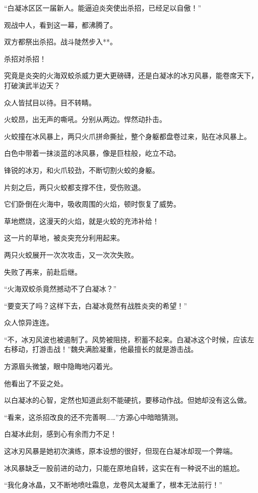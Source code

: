 \begin{this_body}
“白凝冰区区一届新人。能逼迫炎突使出杀招，已经足以自傲！”

观战中人，看到这一幕，都沸腾了。

双方都祭出杀招。战斗陡然步入**。

杀招对杀招！

究竟是炎突的火海双蛟杀威力更大更磅礴，还是白凝冰的冰刃风暴，能卷席天下，打破演武半边天？

众人皆拭目以待。目不转睛。

火蛟昂，出无声的嘶吼。分别从两边。悍然动扑击。

火蛟撞在冰风暴上，两只火爪拼命撕扯，整个身躯都盘卷过来，贴在冰风暴上。

白色中带着一抹淡蓝的冰风暴，像是巨柱般，屹立不动。

锋锐的冰刃，和火爪较劲，不断切割火蛟的身躯。

片刻之后，两只火蛟都支撑不住，受伤败退。

它们卧倒在火海中，吸收周围的火焰，顿时恢复了威势。

草地燃烧，这漫天的火焰，就是火蛟的充沛补给！

这一片的草地，被炎突充分利用起来。

两只火蛟展开一次次攻击，又一次次失败。

失败了再来，前赴后继。

“火海双蛟杀竟然撼动不了白凝冰？”

“要变天了吗？这样下去，白凝冰竟然有战胜炎突的希望！”

众人惊异连连。

“不，冰刃风波也被遏制了。风势被阻挠，积蓄不起来。白凝冰这个时候，应该左右移动，打游击战！”魏央满脸凝重，他最擅长的就是游击战。

方源眉头微皱，眼中隐晦地闪着光。

他看出了不妥之处。

以白凝冰的心智，定然也知道此刻不能硬抗，要移动作战。但她却没有这么做。

“看来，这杀招改良的还不完善啊……”方源心中暗暗猜测。

白凝冰此刻，感到心有余而力不足！

这冰刃风暴是她初次演练，原本设想的很好，但现在白凝冰却现一个弊端。

冰风暴缺乏一股前进的动力，只能在原地自转，这实在有一种说不出的尴尬。

“我化身冰晶，又不断地喷吐霜息，龙卷风太凝重了，根本无法前行！”


\end{this_body}
